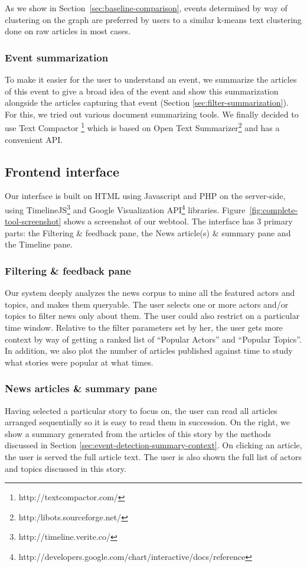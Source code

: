 As we show in Section~\ref{sec:baseline-comparison}, events determined by way of clustering on the graph are preferred by users to a similar k-means text clustering done on raw articles in most cases.

\subsubsection*{Event summarization}
To make it easier for the user to understand an event, we summarize the articles of this event to give a broad idea of the event and show this summarization alongside the articles capturing that event (Section \ref{sec:filter-summarization}). For this, we tried out various document summarizing tools. We finally decided to use Text Compactor \footnote{http://textcompactor.com/} which is based on Open Text Summarizer\footnote{http:/libots.sourceforge.net/} and has a convenient API. 
\subsection {Frontend interface}
Our interface is built on HTML using Javascript and PHP on the server-side, using TimelineJS\footnote{http://timeline.verite.co/} and Google Visualization API\footnote{http://developers.google.com/chart/interactive/docs/reference} libraries.
Figure~\ref{fig:complete-tool-screenshot} shows a screenshot of our webtool. The interface
has 3 primary parts: the Filtering \& feedback pane, the News article(s) \& summary pane and the Timeline pane. 
\subsubsection*{Filtering \& feedback pane}
Our system deeply analyzes the news corpus to mine all the featured actors and topics, and makes them queryable. The user selects one or more actors
and/or topics to filter news only about them. The user could also restrict on a particular time window. Relative to the filter parameters set by her, 
the user gets more context by way of getting a ranked list of ``Popular Actors'' and ``Popular Topics''. In addition, we also plot the number of
articles published against time to study what stories were popular at what times. 
 
\subsubsection*{News articles \& summary pane}\label{sec:filter-summarization}
Having selected a particular story to focus on, the user can read all articles arranged sequentially so it is easy to read them in succession.
On the right, we show a summary generated from the articles of this story by the methods discussed in Section \ref{sec:event-detection-summary-context}.
On clicking an article, the user is served the full article text. The user is also shown the full list of actors and topics discussed in this story.
